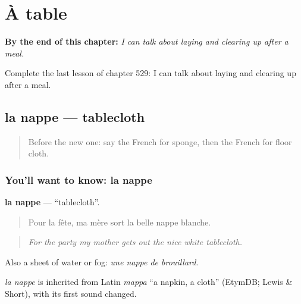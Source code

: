 
\chapter{À table}
\label{ch:fr-a-table}

\begin{chapteropening}
\textbf{By the end of this chapter:} \emph{I can talk about laying and clearing up after a meal.}

Complete the last lesson of chapter 529: I can talk about laying and clearing up after a meal.
\end{chapteropening}

\section[la nappe]{la nappe — tablecloth}

\label{lesson:FR-C529-nappe}



\begin{quote}
Before the new one: say the French for sponge, then the French for floor cloth.
\end{quote}

\subsection*{You'll want to know: la nappe}
\textbf{la nappe} — \textquotedblleft{}tablecloth\textquotedblright{}.

\begin{quote}
Pour la fête, ma mère sort la belle nappe blanche.
\end{quote}

\begin{quote}
\emph{For the party my mother gets out the nice white tablecloth.}
\end{quote}

Also a sheet of water or fog: \emph{une nappe de brouillard}.

\begin{cousinweb}
\emph{la nappe} is inherited from Latin \emph{mappa} \textquotedblleft{}a napkin, a cloth\textquotedblright{} (EtymDB; Lewis \& Short), with its first sound changed.
\end{cousinweb}

